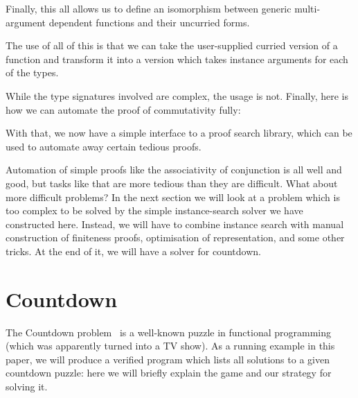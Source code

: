 Finally, this all allows us to define an isomorphism between generic
multi-argument dependent functions and their uncurried forms.
\begin{agdalisting*}
\end{agdalisting*}

The use of all of this is that we can take the user-supplied curried version of
a function and transform it into a version which takes instance arguments for
each of the types.
\begin{agdalisting*}
\end{agdalisting*}
\begin{agdalisting*}
\end{agdalisting*}
While the type signatures involved are complex, the usage is not.
Finally, here is how we can automate the proof of commutativity fully:
\begin{agdalisting*}
\end{agdalisting*}

With that, we now have a simple interface to a proof search library, which can
be used to automate away certain tedious proofs.

Automation of simple proofs like the associativity of conjunction is all well
and good, but tasks like that are more tedious than they are difficult.
What about more difficult problems?
In the next section we will look at a problem which is too complex to be solved
by the simple instance-search solver we have constructed here.
Instead, we will have to combine instance search with manual construction of
finiteness proofs, optimisation of representation, and some other tricks.
At the end of it, we will have a solver for countdown.
\pagebreak
\section{Countdown}

The Countdown problem~\citep{huttonCountdownProblem2002} is a well-known puzzle
in functional programming (which was apparently turned into a TV show).
As a running example in this paper, we will produce a verified program which
lists all solutions to a given countdown puzzle: here we will briefly explain
the game and our strategy for solving it.

